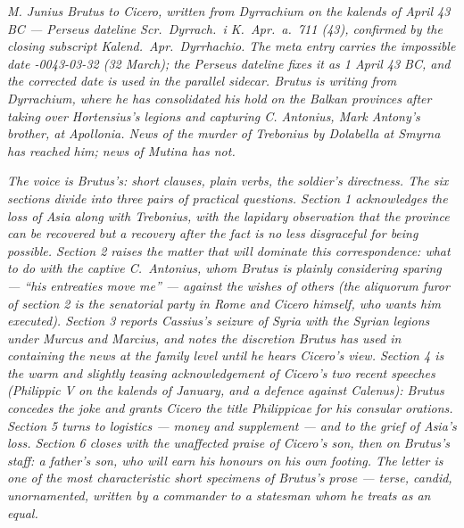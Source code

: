 
\textit{M. Junius Brutus to Cicero, written from Dyrrachium
on the kalends of April 43 BC --- Perseus dateline
\textit{Scr.\ Dyrrach.\ i K.\ Apr.\ a.\ 711 (43)}, confirmed
by the closing subscript \textit{Kalend.\ Apr.\ Dyrrhachio}.
The meta entry carries the impossible date
\textit{-0043-03-32} (32 March); the Perseus dateline
fixes it as 1 April 43 BC, and the corrected date is used
in the parallel sidecar. Brutus is writing from
Dyrrachium, where he has consolidated his hold on the
Balkan provinces after taking over Hortensius's legions
and capturing C. Antonius, Mark Antony's brother, at
Apollonia. News of the murder of Trebonius by Dolabella
at Smyrna has reached him; news of Mutina has not.}

\textit{The voice is Brutus's: short clauses, plain
verbs, the soldier's directness. The six sections divide
into three pairs of practical questions. Section 1
acknowledges the loss of Asia along with Trebonius, with
the lapidary observation that the province can be
recovered but a recovery after the fact is no less
disgraceful for being possible. Section 2 raises the
matter that will dominate this correspondence: what to do
with the captive C.\ Antonius, whom Brutus is plainly
considering sparing --- ``his entreaties move me'' ---
against the wishes of others (the \textit{aliquorum furor}
of section 2 is the senatorial party in Rome and Cicero
himself, who wants him executed). Section 3 reports
Cassius's seizure of Syria with the Syrian legions
under Murcus and Marcius, and notes the discretion
Brutus has used in containing the news at the family
level until he hears Cicero's view. Section 4 is the
warm and slightly teasing acknowledgement of Cicero's
two recent speeches (Philippic V on the kalends of
January, and a defence against Calenus): Brutus concedes
the joke and grants Cicero the title \textit{Philippicae}
for his consular orations. Section 5 turns to logistics
--- money and supplement --- and to the grief of Asia's
loss. Section 6 closes with the unaffected praise of
Cicero's son, then on Brutus's staff: a father's son,
who will earn his honours on his own footing. The
letter is one of the most characteristic short
specimens of Brutus's prose --- terse, candid,
unornamented, written by a commander to a statesman
whom he treats as an equal.}
